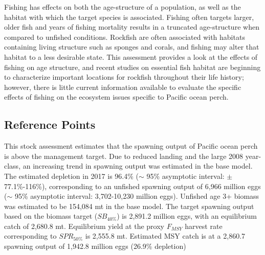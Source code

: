 \documentclass[12pt,]{article}
\begin{document}
Fishing has effects on both the age-structure of a population, as well
as the habitat with which the target species is associated. Fishing
often targets larger, older fish and years of fishing mortality results
in a truncated age-structure when compared to unfished conditions.
Rockfish are often associated with habitats containing living structure
such as sponges and corals, and fishing may alter that habitat to a less
desirable state. This assessment provides a look at the effects of
fishing on age structure, and recent studies on essential fish habitat
are beginning to characterize important locations for rockfish
throughout their life history; however, there is little current
information available to evaluate the specific effects of fishing on the
ecosystem issues specific to Pacific ocean perch.

\subsection*{Reference Points}\label{reference-points}

This stock assessment estimates that the spawning output of Pacific
ocean perch is above the management target. Due to reduced landing and
the large 2008 year-class, an increasing trend in spawning output was
estimated in the base model. The estimated depletion in 2017 is 96.4\%
(\(\sim\) 95\% asymptotic interval: \(\pm\) 77.1\%-116\%), corresponding
to an unfished spawning output of 6,966 million eggs (\(\sim\) 95\%
asymptotic interval: 3,702-10,230 million eggs). Unfished age 3+ biomass
was estimated to be 154,084 mt in the base model. The target spawning
output based on the biomass target (\(SB_{40\%}\)) is 2,891.2 million
eggs, with an equilibrium catch of 2,680.8 mt. Equilibrium yield at the
proxy \(F_{MSY}\) harvest rate corresponding to \(SPR_{50\%}\) is
2,555.8 mt. Estimated MSY catch is at a 2,860.7 spawning output of
1,942.8 million eggs (26.9\% depletion)
\end{document}
